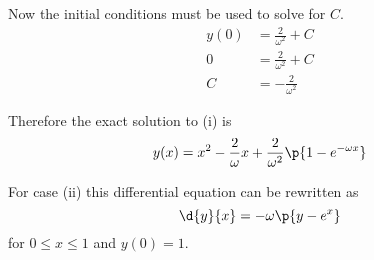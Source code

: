 \documentclass[11pt]{article}
\begin{document}
\begin{enumerate}
\begin{enumerate}
                Now the initial conditions must be used to solve for $C$.
                \begin{align*}
                    y(0) &= \frac{2}{\omega^2} + C \\
                    0 &= \frac{2}{\omega^2} + C \\
                    C &= -\frac{2}{\omega^2}
                \end{align*}

                Therefore the exact solution to (i) is
                \[
                    y(x) = x^2 - \frac{2}{\omega} x + \frac{2}{\omega^2}\p{1 - e^{-\omega x}} \\
                \]

                For case (ii) this differential equation can be rewritten as
                \[
                    \d{y}{x} = -\omega\p{y - e^x}
                \]
                for $0 \le x \le 1$ and $y(0) = 1$.


\end{enumerate}
\end{enumerate}
\end{document}
